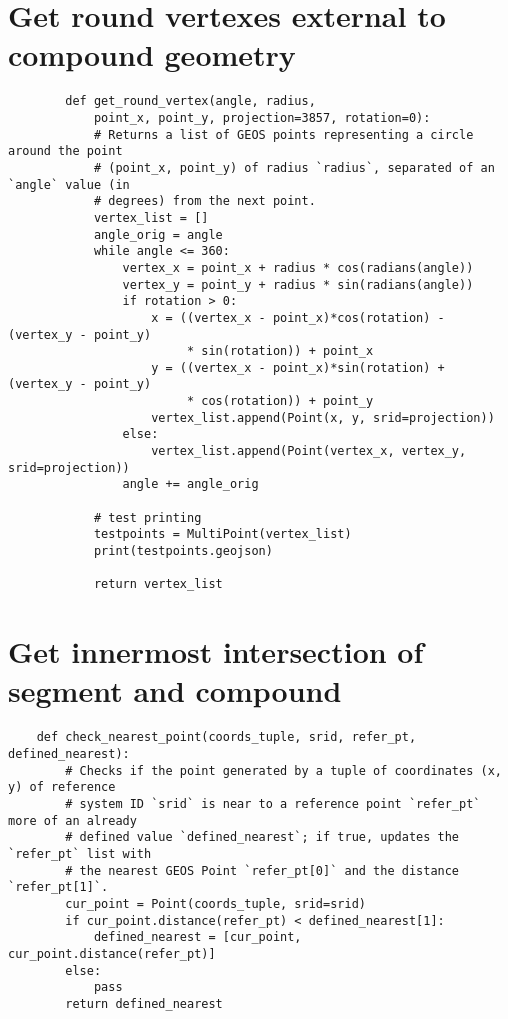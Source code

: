 \section{Get round vertexes external to compound geometry}
\label{sec:code-vertexes}

    \begin{lstlisting}
        def get_round_vertex(angle, radius,
            point_x, point_y, projection=3857, rotation=0):
            # Returns a list of GEOS points representing a circle around the point
            # (point_x, point_y) of radius `radius`, separated of an `angle` value (in
            # degrees) from the next point.
            vertex_list = []
            angle_orig = angle
            while angle <= 360:
                vertex_x = point_x + radius * cos(radians(angle))
                vertex_y = point_y + radius * sin(radians(angle))
                if rotation > 0:
                    x = ((vertex_x - point_x)*cos(rotation) - (vertex_y - point_y)
                         * sin(rotation)) + point_x
                    y = ((vertex_x - point_x)*sin(rotation) + (vertex_y - point_y)
                         * cos(rotation)) + point_y
                    vertex_list.append(Point(x, y, srid=projection))
                else:
                    vertex_list.append(Point(vertex_x, vertex_y, srid=projection))
                angle += angle_orig

            # test printing
            testpoints = MultiPoint(vertex_list)
            print(testpoints.geojson)

            return vertex_list
    \end{lstlisting}

\section{Get innermost intersection of segment and compound}
\label{sec:code-intersection}

    \begin{lstlisting}
    def check_nearest_point(coords_tuple, srid, refer_pt, defined_nearest):
        # Checks if the point generated by a tuple of coordinates (x, y) of reference
        # system ID `srid` is near to a reference point `refer_pt` more of an already
        # defined value `defined_nearest`; if true, updates the `refer_pt` list with
        # the nearest GEOS Point `refer_pt[0]` and the distance `refer_pt[1]`.
        cur_point = Point(coords_tuple, srid=srid)
        if cur_point.distance(refer_pt) < defined_nearest[1]:
            defined_nearest = [cur_point, cur_point.distance(refer_pt)]
        else:
            pass
        return defined_nearest
    \end{lstlisting}

